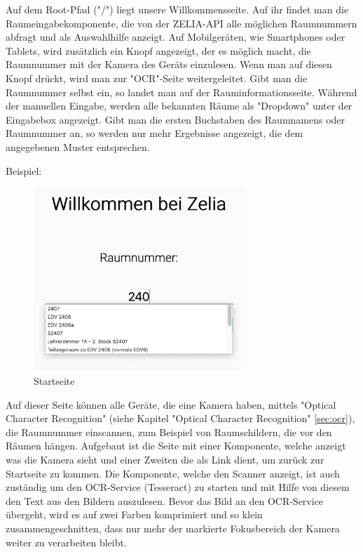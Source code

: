 \label{sec:webcompstart}

Auf dem Root-Pfad ("/") liegt unsere Willkommensseite. Auf ihr findet man die Raumeingabekomponente, die von der ZELIA-API alle möglichen Raumnummern abfragt und als Auswahlhilfe anzeigt. Auf Mobilgeräten, wie Smartphones oder Tablets, wird zusätzlich ein Knopf angezeigt, der es möglich macht, die Raumnummer mit der Kamera des Geräts einzulesen. Wenn man auf diesen Knopf drückt, wird man zur "OCR"-Seite weitergeleitet. Gibt man die Raumnummer selbst ein, so landet man auf der Rauminformationsseite. Während der manuellen Eingabe, werden alle bekannten Räume als "Dropdown" unter der Eingabebox angezeigt. Gibt man die ersten Buchstaben des Raumnamens oder Raumnummer an, so werden nur mehr Ergebnisse angezeigt, die dem angegebenen Muster entsprechen.

Beispiel:

\begin{figure}[H]
    \centering
    \includegraphics[width=80mm]{media/WebComponents/Startseite_light.png}
    \caption{Startseite}
    \label{fig:compinput}
\end{figure}



Auf dieser Seite können alle Geräte, die eine Kamera haben, mittels "Optical Character Recognition" (siehe Kapitel "Optical Character Recognition" \ref{sec:ocr}), die Raumnummer einscannen, zum Beispiel von Raumschildern, die vor den Räumen hängen. Aufgebaut ist die Seite mit einer Komponente, welche anzeigt was die Kamera sieht und einer Zweiten die als Link dient, um zurück zur Startseite zu kommen. Die Komponente, welche den Scanner anzeigt, ist auch zuständig um den OCR-Service (Tesseract) zu starten und mit Hilfe von diesem den Text aus den Bildern auszulesen. Bevor das Bild an den OCR-Service übergeht, wird es auf zwei Farben komprimiert und so klein zusammengeschnitten, dass nur mehr der markierte Fokusbereich der Kamera weiter zu verarbeiten bleibt.

